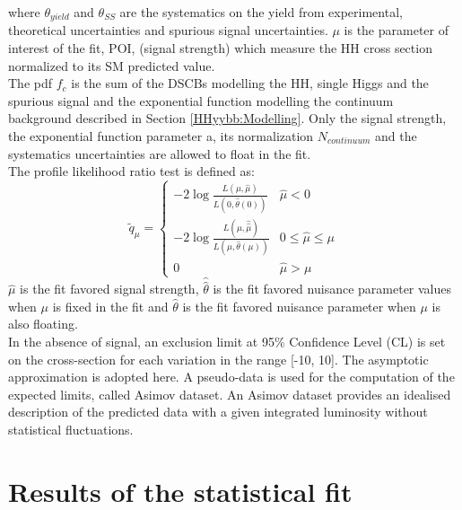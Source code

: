 where $\theta_{yield}$ and $\theta_{SS}$ are the systematics on the yield from experimental, theoretical uncertainties and spurious signal uncertainties. $\mu$ is the parameter of interest of the fit, POI, (signal strength) which measure the HH cross section normalized to its SM predicted value. \\
The pdf $f_c$ is the sum of the DSCBs modelling the HH, single Higgs and the spurious signal and the exponential function modelling the continuum background described in Section \ref{HHyybb:Modelling}. Only the signal strength, the exponential function parameter a, its normalization $N_{continuum}$ and the systematics uncertainties are allowed to float in the fit. \\
The profile likelihood ratio test is defined as: 
\begin{equation}
    \tilde{q}_{\mu}=\left\{\begin{array}{ll}
-2 \log \frac{L(\mu, \hat{\mu})}{L(0, \hat{\theta}(0))} & \hat{\mu}<0 \\
-2 \log \frac{L(\mu, \hat{\hat{\mu}})}{L(\hat{\mu}, \hat{\theta}(\mu))} & 0 \leq \hat{\mu} \leq \mu \\
0 & \hat{\mu}>\mu
\end{array}\right.
\end{equation}
$\hat{\mu}$ is the fit favored signal strength, $\hat{\hat{\theta}}$ is the fit favored nuisance parameter values when $\mu$ is fixed in the fit and $\hat{\theta}$ is the fit favored nuisance parameter when $\mu$ is also floating. \\
In the absence of signal, an exclusion limit at 95\% Confidence Level (CL) is set on the \HHyybb cross-section for each \kl variation in the range [-10, 10]. The asymptotic approximation \cite{Z} is adopted here. A pseudo-data is used for the computation of the expected limits, called Asimov dataset. An Asimov dataset provides an idealised description of the predicted data with a given integrated luminosity without statistical fluctuations.

\section{Results of the statistical fit}
\label{HHyybb:Results}


